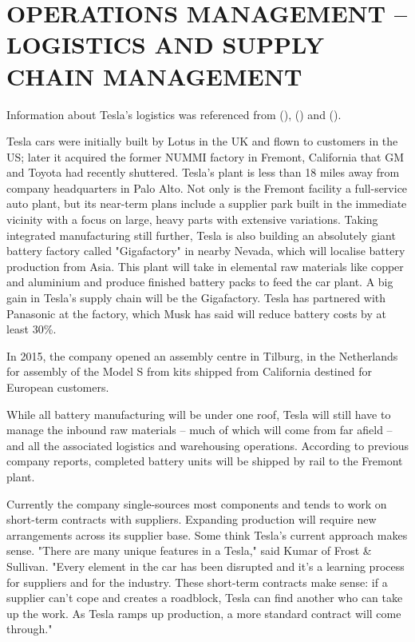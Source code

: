\documentclass[12pt]{article}
\begin{document}
\section{OPERATIONS MANAGEMENT – LOGISTICS AND SUPPLY CHAIN MANAGEMENT}

Information about Tesla's logistics was referenced from (\cite{ho16}), (\cite{om16}) and (\cite{ta14}).

Tesla cars were initially built by Lotus in the UK and flown to customers in the US; later it acquired the former NUMMI factory in Fremont, California that GM and Toyota had recently shuttered. Tesla’s plant is less than 18 miles away from company headquarters in Palo Alto. Not only is the Fremont facility a full-service auto plant, but its near-term plans include a supplier park built in the immediate vicinity with a focus on large, heavy parts with extensive variations. Taking integrated manufacturing still further, Tesla is also building an absolutely giant battery factory called "Gigafactory" in nearby Nevada, which will localise battery production from Asia. This plant will take in elemental raw materials like copper and aluminium and produce finished battery packs to feed the car plant. A big gain in Tesla’s supply chain will be the Gigafactory. Tesla has partnered with Panasonic at the factory, which Musk has said will reduce battery costs by at least 30\%.

In 2015, the company opened an assembly centre in Tilburg, in the Netherlands for assembly of the Model S from kits shipped from California destined for European customers.

While all battery manufacturing will be under one roof, Tesla will still have to manage the inbound raw materials – much of which will come from far afield – and all the associated logistics and warehousing operations. According to previous company reports, completed battery units will be shipped by rail to the Fremont plant.

Currently the company single-sources most components and tends to work on short-term contracts with suppliers. Expanding production will require new arrangements across its supplier base. Some think Tesla’s current approach makes sense. "There are many unique features in a Tesla," said Kumar of Frost \& Sullivan. "Every element in the car has been disrupted and it’s a learning process for suppliers and for the industry. These short-term contracts make sense: if a supplier can’t cope and creates a roadblock, Tesla can find another who can take up the work. As Tesla ramps up production, a more standard contract will come through."
\end{document}
